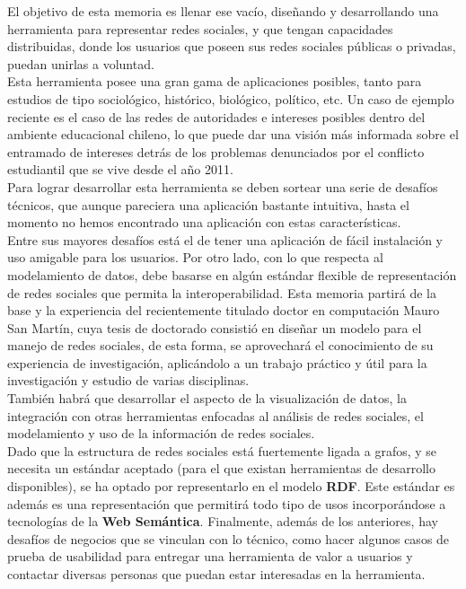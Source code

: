 \begin{intro}
El objetivo de esta memoria es llenar ese vacío, diseñando y desarrollando una herramienta para representar redes sociales, y que tengan capacidades distribuidas, donde los usuarios que poseen sus redes sociales públicas o privadas, puedan unirlas a voluntad.\\

Esta herramienta posee una gran gama de aplicaciones posibles, tanto para estudios de tipo sociológico, histórico, biológico, político, etc. Un caso de ejemplo reciente es el caso de las redes de autoridades e intereses posibles dentro del ambiente educacional chileno, lo que puede dar una visión más informada sobre el entramado de intereses detrás de los problemas denunciados por el conflicto estudiantil que se vive desde el año 2011.\\

Para lograr desarrollar esta herramienta se deben sortear una serie de desafíos técnicos, que aunque pareciera una aplicación bastante intuitiva, hasta el momento no hemos encontrado una aplicación con estas características.\\

Entre sus mayores desafíos está el de tener una aplicación de fácil instalación y uso amigable para los usuarios. Por otro lado, con lo que respecta al modelamiento de datos, debe basarse en algún estándar flexible de representación de redes sociales que permita la interoperabilidad. Esta memoria partirá de la base y la experiencia del recientemente titulado doctor en computación Mauro San Martín, cuya tesis de doctorado consistió en diseñar un modelo para el manejo de redes sociales, de esta forma, se aprovechará el conocimiento de su experiencia de investigación, aplicándolo a un trabajo práctico y útil para la investigación y estudio de varias disciplinas.\\

También habrá que desarrollar el aspecto de la visualización de datos, la integración con otras herramientas enfocadas al análisis de redes sociales, el modelamiento y uso de la información de redes sociales.\\

Dado que la estructura de redes sociales está fuertemente ligada a grafos, y se necesita un estándar aceptado (para el que existan herramientas de desarrollo disponibles), se ha optado por representarlo en el modelo \textbf{RDF}. Este estándar es además es una representación que permitirá todo tipo de usos incorporándose a tecnologías de la \textbf{Web Semántica}. Finalmente, además de los anteriores, hay desafíos de negocios que se vinculan con lo técnico, como hacer algunos casos de prueba de usabilidad para entregar una herramienta de valor a usuarios y contactar diversas personas que puedan estar interesadas en la herramienta.\\


\end{intro}
